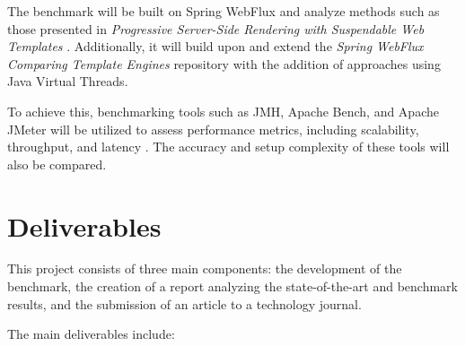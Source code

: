 \documentclass[a4paper,twoside,11pt]{article}
\begin{document}
The benchmark will be built on Spring WebFlux and analyze methods such as those
presented in \textit{Progressive Server-Side Rendering with Suspendable Web
  Templates} \cite{pssr-susp}. Additionally, it will build upon and extend the
\textit{Spring WebFlux Comparing Template Engines} repository
\cite{spring-comparing-template-engines} with the addition of approaches using
Java Virtual Threads.

To achieve this, benchmarking tools such as JMH, Apache Bench, and Apache
JMeter will be utilized to assess performance metrics, including scalability,
throughput, and latency \cite{benchmarking_web, jmh_benchmark}. The accuracy
and setup complexity of these tools will also be compared.

\section{Deliverables}

This project consists of three main components: the development of the
benchmark, the creation of a report analyzing the state-of-the-art and
benchmark results, and the submission of an article to a technology journal.

The main deliverables include:
\end{document}
